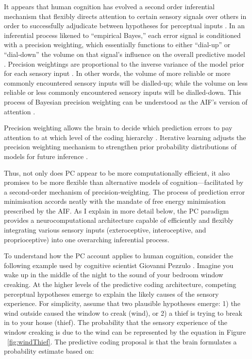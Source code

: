 \begin{CJK}{UTF8}{gbsn}
It appears that human cognition has evolved a second order inferential mechanism that flexibly directs attention to certain sensory signals over others in order to successfully adjudicate between hypotheses for perceptual inputs \citep{Clark2013}.  In an inferential process likened to ``empirical Bayes,'' each error signal is conditioned with a precision weighting, which essentially functions to either ``dial-up'' or ``dial-down'' the volume on that signal's influence on the overall predictive model \citep{Clark2015}.  Precision weightings are proportional to the inverse variance of the model prior for each sensory input \citep{Ernst2004,FitzGerald2014}.  In other words, the volume of more reliable or more commonly encountered sensory inputs will be dialled-up; while the volume on less reliable or less commonly encountered sensory inputs will be dialled-down. This process of Bayesian precision weighting can be understood as the AIF's version of attention \citep{Ramstead2016}.

Precision weighting allows the brain to decide which prediction errors to pay attention to at which level of the coding hierarchy \citep[be it high and conceptual or deep and sensory][]{Friston2015}.  Iterative learning adjusts the precision weighting mechanism to strengthen prior probability distributions of models for future inference \citep{Robbins1964}.

Thus, not only does PC appear to be more computationally efficient, it also promises to be more flexible than alternative models of cognition---facilitated by a second-order mechanism of precision-weighting.  The process of prediction error minimisation accords neatly with the mandate of free energy minimisation prescribed by the AIF.  As I explain in more detail below, the PC paradigm provides a neurocomputational architecture capable of efficiently and flexibly integrating various sensory inputs (exteroceptive, interoceptive, and proprioceptive) into one overarching inferential process.


To understand how the PC account applies to human cognition, consider the following example used by cognitive scientist Giovanni Pezzulo \textcite{Pezzulo2013}.  Imagine you wake up in the middle of the night to the sound of your bedroom window creaking.  At the higher levels of the predictive coding architecture, competing perceptual hypotheses emerge to explain the likely causes of the sensory experience.  For simplicity, assume that two plausible hypotheses emerge: 1) the wind outside caused the window to creak (wind), or 2) a thief is trying to break in to your house (thief).  The probability that the sensory experience of the window creaking is due to the wind can be represented by the equation in Figure ~\ref{fig:windThief}.  The predictive coding proposal is that the brain formulates a probability estimate based on:


\end{CJK}

